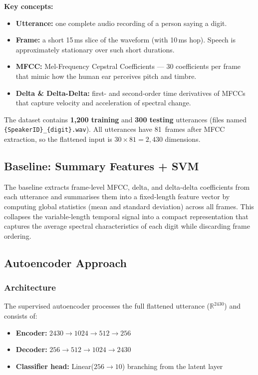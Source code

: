 \documentclass[12pt, a4paper]{article}
\begin{document}
\textbf{Key concepts:}
\begin{itemize}
    \item \textbf{Utterance:} one complete audio recording of a person saying a digit.
    \item \textbf{Frame:} a short 15\,ms slice of the waveform (with 10\,ms hop).
          Speech is approximately stationary over such short durations.
    \item \textbf{MFCC:} Mel-Frequency Cepstral Coefficients --- 30 coefficients per frame
          that mimic how the human ear perceives pitch and timbre.
    \item \textbf{Delta \& Delta-Delta:} first- and second-order time derivatives of MFCCs
          that capture velocity and acceleration of spectral change.
\end{itemize}

The dataset contains \textbf{1{,}200 training} and \textbf{300 testing} utterances
(files named \texttt{\{SpeakerID\}\_\{digit\}.wav}).
All utterances have 81~frames after MFCC extraction, so the flattened input is
$30 \times 81 = 2{,}430$ dimensions.

\subsection{Baseline: Summary Features + SVM}

The baseline extracts frame-level MFCC, delta, and delta-delta coefficients from each
utterance and summarises them into a fixed-length feature vector by computing global
statistics (mean and standard deviation) across all frames.  This collapses the
variable-length temporal signal into a compact representation that captures the
average spectral characteristics of each digit while discarding frame ordering.

\subsection{Autoencoder Approach}

\subsubsection{Architecture}

The supervised autoencoder processes the full flattened utterance ($\mathbb{R}^{2430}$)
and consists of:

\begin{itemize}
    \item \textbf{Encoder:} $2430 \to 1024 \to 512 \to 256$
    \item \textbf{Decoder:} $256 \to 512 \to 1024 \to 2430$
    \item \textbf{Classifier head:} Linear($256 \to 10$) branching from the latent layer
\end{itemize}
\end{document}
